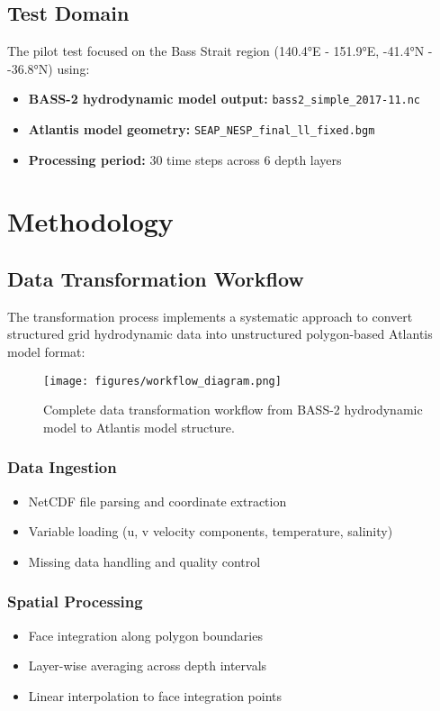 \documentclass[12pt,a4paper,twoside,times,sky,formal]{csiroreport2017}
\begin{document}
\subsection{Test Domain}
The pilot test focused on the Bass Strait region (140.4°E - 151.9°E, -41.4°N - -36.8°N) using:
\begin{itemize}
\item \textbf{BASS-2 hydrodynamic model output:} \texttt{bass2\_simple\_2017-11.nc}
\item \textbf{Atlantis model geometry:} \texttt{SEAP\_NESP\_final\_ll\_fixed.bgm}
\item \textbf{Processing period:} 30 time steps across 6 depth layers
\end{itemize}

\section{Methodology}

\subsection{Data Transformation Workflow}

The transformation process implements a systematic approach to convert structured grid hydrodynamic data into unstructured polygon-based Atlantis model format:

\begin{figure}[H]
\centering
\texttt{[image: figures/workflow\_diagram.png]}
\caption{Complete data transformation workflow from BASS-2 hydrodynamic model to Atlantis model structure.}
\label{fig:workflow}
\end{figure}

\subsubsection{Data Ingestion}
\begin{itemize}
\item NetCDF file parsing and coordinate extraction
\item Variable loading (u, v velocity components, temperature, salinity)
\item Missing data handling and quality control
\end{itemize}

\subsubsection{Spatial Processing}
\begin{itemize}
\item Face integration along polygon boundaries
\item Layer-wise averaging across depth intervals
\item Linear interpolation to face integration points
\end{itemize}
\end{document}
